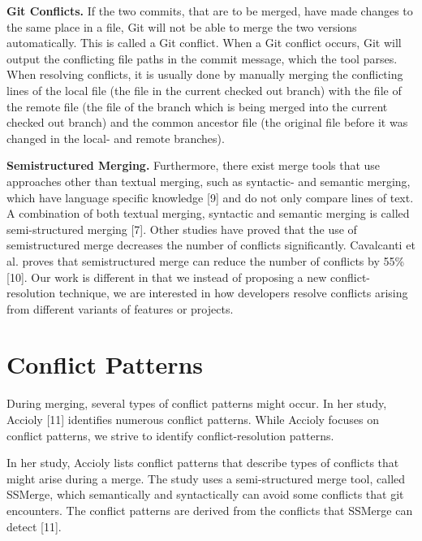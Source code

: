 \textbf{Git Conflicts.} If the two commits, that are to be merged, have made changes to the same place in a file, Git will not be able to merge the two versions automatically. This is called a Git conflict. When a Git conflict occurs, Git will output the conflicting file paths in the commit message, which the tool parses. When resolving conflicts, it is usually done by manually merging the conflicting lines of the local file (the file in the current checked out branch) with the file of the remote file (the file of the branch which is being merged into the current checked out branch) and the common ancestor file (the original file before it was changed in the local- and remote branches).

\textbf{Semistructured Merging.} Furthermore, there exist merge tools that use approaches other than textual merging, such as syntactic- and semantic merging, which have language specific knowledge [9] and do not only compare lines of text. A combination of both textual merging, syntactic and semantic merging is called semi-structured merging [7]. Other studies have proved that the use of semistructured merge decreases the number of conflicts significantly. Cavalcanti et al. proves that semistructured merge can reduce the number of conflicts by 55\% [10]. Our work is different in that we instead of proposing a new conflict-resolution technique, we are interested in how developers resolve conflicts arising from different variants of features or projects.

\section{Conflict Patterns}
During merging, several types of conflict patterns might occur. In her study, Accioly [11] identifies numerous conflict patterns. While Accioly focuses on conflict patterns, we strive to identify conflict-resolution patterns.

In her study, Accioly lists conflict patterns that describe types of conflicts that might arise during a merge. The study uses a semi-structured merge tool, called SSMerge, which semantically and syntactically can avoid some conflicts that git encounters. The conflict patterns are derived from the conflicts that SSMerge can detect [11].

